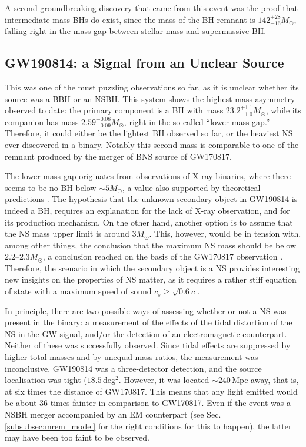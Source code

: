 \documentclass[binding=0.6cm, LaM]{sapthesis}
\begin{document}
	A second groundbreaking discovery that came from this event 
	was the proof that intermediate-mass BHs do exist,
	since the mass of the BH remnant is $142^{+28}_{-16}M_\odot$, 
	falling right in the mass gap between stellar-mass and supermassive BH.

\subsection{GW190814: a Signal from an Unclear Source}
\label{subsec:GW190814}
	This was one of the must puzzling observations so far, as it is unclear
	whether its source was a BBH or an NSBH.
	This system shows the highest mass asymmetry observed to date:
	the primary component is a BH with mass $23.2^{+1.1}_{-1.0}M_\odot$, 
	while its companion has mass $2.59^{+0.08}_{-0.09}M_\odot$, right in the so called
	``lower mass gap.''  Therefore, it could either be the lightest BH
	observed so far, or the heaviest NS ever discovered in a binary.
        Notably this second mass is comparable to one of the remnant 
	produced by the merger of BNS source of GW170817.

	The lower mass gap originates from observations of X-ray binaries, 
	where there seems to be no BH below $\sim 5M_\odot$,
	a value also supported by theoretical predictions \cite{124}.
	The hypothesis that the unknown secondary object in GW190814 is indeed a BH, 
	requires an explanation for the lack of X-ray observation, 
	and for its production mechanism.
	On the other hand, another option is to assume that the NS mass upper limit is around $3M_\odot$.
	This, however, would be in tension with, among other things, the conclusion that 
        the maximum NS mass should be below $2.2$--$2.3M_\odot$, 
	a conclusion reached on the basis of the GW170817 observation \cite{122,123}.
	Therefore, the scenario in which the secondary object is a NS provides interesting new insights on the properties of NS matter, 
	as it requires a rather stiff equation of state with a maximum speed of sound $c_s \geq \sqrt{0.6}c$ \cite{121}.

	In principle, there are two possible ways of assessing whether or not a NS was present in the binary: 
	a measurement of the effects of the tidal distortion of the NS 
	in the GW signal, and/or the detection of an electromagnetic counterpart.
        Neither of these was successfully observed.
	Since tidal effects are suppressed by higher total masses 	
	and by unequal mass ratios, the measurement was inconclusive. 
	GW190814 was a three-detector detection, and the source localisation was tight ($18.5\,$deg$^2$.  
	However, it was located $\sim 240\,$Mpc away, that is,
	at six times the distance of GW170817.  
	This means that any light emitted would be about 36 times fainter in comparison to GW170817.
	Even if the event was a NSBH merger accompanied by an EM counterpart
	(see Sec.\,\ref{subsubsec:mrem_model} for the right conditions for this to happen), 
	the latter may have been too faint to be observed.
\end{document}
